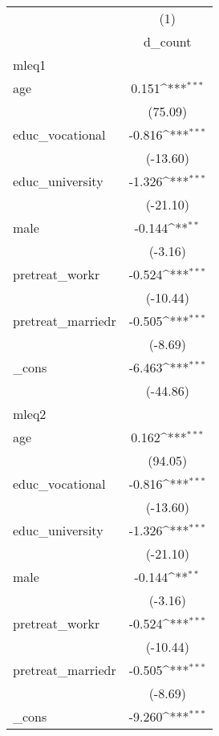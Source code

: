 {
\def\sym#1{\ifmmode^{#1}\else\(^{#1}\)\fi}
\begin{tabular}{l*{1}{c}}
\hline\hline
            &\multicolumn{1}{c}{(1)}\\
            &\multicolumn{1}{c}{d\_count}\\
\hline
mleq1       &                     \\
age         &       0.151\sym{***}\\
            &     (75.09)         \\
[1em]
educ\_vocational&      -0.816\sym{***}\\
            &    (-13.60)         \\
[1em]
educ\_university&      -1.326\sym{***}\\
            &    (-21.10)         \\
[1em]
male        &      -0.144\sym{**} \\
            &     (-3.16)         \\
[1em]
pretreat\_workr&      -0.524\sym{***}\\
            &    (-10.44)         \\
[1em]
pretreat\_marriedr&      -0.505\sym{***}\\
            &     (-8.69)         \\
[1em]
\_cons      &      -6.463\sym{***}\\
            &    (-44.86)         \\
\hline
mleq2       &                     \\
age         &       0.162\sym{***}\\
            &     (94.05)         \\
[1em]
educ\_vocational&      -0.816\sym{***}\\
            &    (-13.60)         \\
[1em]
educ\_university&      -1.326\sym{***}\\
            &    (-21.10)         \\
[1em]
male        &      -0.144\sym{**} \\
            &     (-3.16)         \\
[1em]
pretreat\_workr&      -0.524\sym{***}\\
            &    (-10.44)         \\
[1em]
pretreat\_marriedr&      -0.505\sym{***}\\
            &     (-8.69)         \\
[1em]
\_cons      &      -9.260\sym{***}\\

\end{tabular}}
